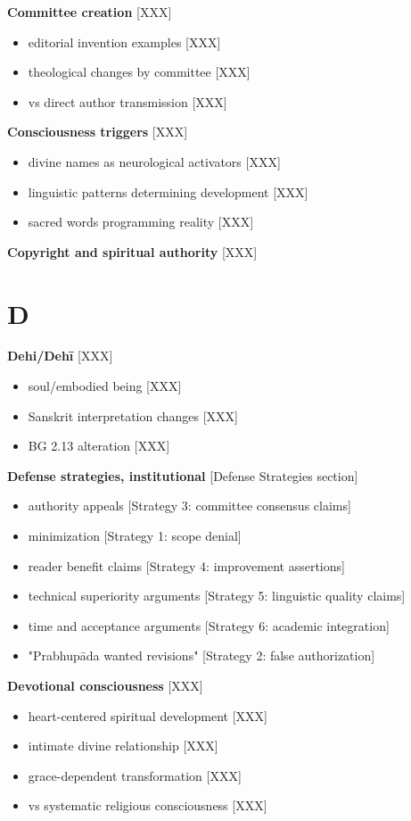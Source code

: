 \documentclass[11pt,twoside]{book}
\begin{document}
\textbf{\textbf{Committee creation}} {[}XXX]
\begin{itemize}
\item editorial invention examples [XXX]
\item theological changes by committee [XXX]
\item vs direct author transmission [XXX]
\end{itemize}

\textbf{\textbf{Consciousness triggers}} {[}XXX]
\begin{itemize}
\item divine names as neurological activators [XXX]
\item linguistic patterns determining development [XXX]
\item sacred words programming reality [XXX]
\end{itemize}

\textbf{\textbf{Copyright and spiritual authority}} {[}XXX]
\section*{D}
\label{sec:org301f442}

\textbf{\textbf{Dehi/Dehī}} {[}XXX]
\begin{itemize}
\item soul/embodied being [XXX]
\item Sanskrit interpretation changes [XXX]
\item BG 2.13 alteration [XXX]
\end{itemize}

\textbf{\textbf{Defense strategies, institutional}} {[}Defense Strategies section]
\begin{itemize}
\item authority appeals [Strategy 3: committee consensus claims]
\item minimization [Strategy 1: scope denial]
\item reader benefit claims [Strategy 4: improvement assertions]
\item technical superiority arguments [Strategy 5: linguistic quality claims]
\item time and acceptance arguments [Strategy 6: academic integration]
\item "Prabhupāda wanted revisions" [Strategy 2: false authorization]
\end{itemize}

\textbf{\textbf{Devotional consciousness}} {[}XXX]
\begin{itemize}
\item heart-centered spiritual development [XXX]
\item intimate divine relationship [XXX]
\item grace-dependent transformation [XXX]
\item vs systematic religious consciousness [XXX]
\end{itemize}
\end{document}
